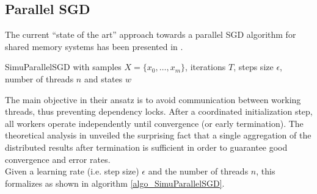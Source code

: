\documentclass{acm_proc_article-sp}
\begin{document}
\subsection{Parallel SGD\label{sec_psgd}}
The current ``state of the art'' approach towards a parallel SGD
algorithm for shared memory systems has been presented in \cite{SGDsmola}.
\begin{algorithm}
\caption{SimuParallelSGD 
with samples $X=\{x_0,\dots,x_m\}$, iterations $T$, steps size 
$\epsilon$, number of threads $n$ and states $w$}
\label{algo_SimuParallelSGD}
\begin{algorithmic}[1]
\EndFor 
\EndFor
{}
\end{algorithmic}
\end{algorithm}
The main objective in their ansatz is to avoid communication between working
threads, thus preventing dependency locks. After a coordinated initialization
step, all workers operate independently until convergence (or early termination).
The theoretical analysis in \cite{SGDsmola} unveiled the surprising fact that a single
aggregation of the distributed results after termination is sufficient in order to 
guarantee good convergence and error rates.\\
Given a learning rate (i.e. step size) $\epsilon$ and the number of threads $n$,
this formalizes as shown in algorithm \ref{algo_SimuParallelSGD}.
\end{document}
